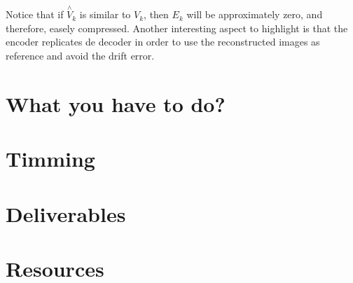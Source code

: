 Notice that if $\overset{\wedge}{{V}}_k$ is similar to $V_k$, then
$E_k$ will be approximately zero, and therefore, easely
compressed. Another interesting aspect to highlight is that the
encoder replicates de decoder in order to use the reconstructed images
as reference and avoid the drift error.

\section{What you have to do?}

\section{Timming}

\section{Deliverables}

\section{Resources}

\renewcommand{\addcontentsline}[3]{}%

